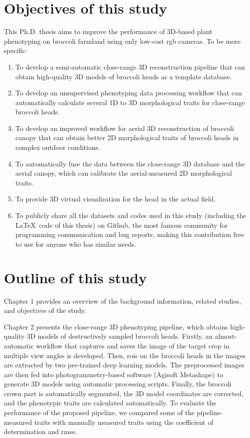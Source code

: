 \section{Objectives of this study}

This Ph.D. thesis aims to improve the performance of 3D-based plant phenotyping on broccoli farmland using only low-cost \gls{rgb} cameras. To be more specific:

\begin{enumerate}
    \item To develop a semi-automatic close-range 3D reconstruction pipeline that can obtain high-quality 3D models of broccoli heads as a template database.
    \item To develop an unsupervised phenotyping data processing workflow that can automatically calculate several 1D to 3D morphological traits for close-range broccoli heads.
    \item To develop an improved workflow for aerial 3D reconstruction of broccoli canopy that can obtain better 2D morphological traits of broccoli heads in complex outdoor conditions.
    \item To automatically fuse the data between the close-range 3D database and the aerial canopy, which can calibrate the aerial-measured 2D morphological traits.
    \item To provide 3D virtual visualization for the head in the actual field.
    \item To publicly share all the datasets and codes used in this study (including the \LaTeX~code of this thesis) on Github, the most famous community for programming communication and bug reports, making this contribution free to use for anyone who has similar needs.
\end{enumerate}


\section{Outline of this study}

Chapter 1 provides an overview of the background information, related studies, and objectives of the study.

Chapter 2 presents the close-range 3D phenotyping pipeline, which obtains high-quality 3D models of destructively sampled broccoli heads. Firstly, an almost-automatic workflow that captures and saves the image of the target crop in multiple view angles is developed. Then, \gls{roi}s on the broccoli heads in the images are extracted by two pre-trained deep learning models. The preprocessed images are then fed into photogrammetry-based software (Agisoft Metashape) to generate 3D models using automatic processing scripts. Finally, the broccoli crown part is automatically segmented, the 3D model coordinates are corrected, and the phenotypic traits are calculated automatically. To evaluate the performance of the proposed pipeline, we compared some of the pipeline-measured traits with manually measured traits using the coefficient of determination and \gls{rmse}.

